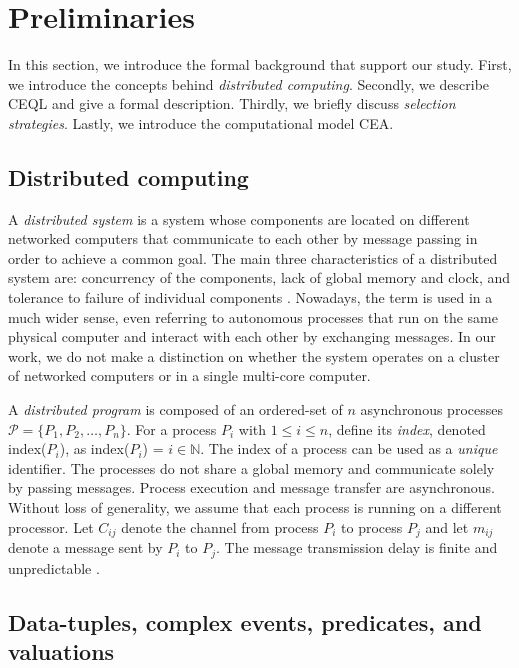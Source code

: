 \chapter{Preliminaries}\label{chapter:preliminaries}

In this section, we introduce the formal background that support our study.
First, we introduce the concepts behind \emph{distributed computing}.
Secondly, we describe CEQL and give a formal description.
Thirdly, we briefly discuss \emph{selection strategies}.
Lastly, we introduce the computational model CEA.

\section{Distributed computing}\label{sec:distributed_computing}

A \emph{distributed system} is a system whose components are located on different networked computers that communicate to each other by message passing in order to achieve a common goal. The main three characteristics of a distributed system are: concurrency of the components, lack of global memory and clock, and tolerance to failure of individual components \cite{distributed-computing-book}. Nowadays, the term is used in a much wider sense, even referring to autonomous processes that run on the same physical computer and interact with each other by exchanging messages. In our work, we do not make a distinction on whether the system operates on a cluster of networked computers or in a single multi-core computer.

A \emph{distributed program} is composed of an ordered-set of $n$ asynchronous processes $\mathcal{P} = \{ P_{1}, P_{2}, \ldots, P_{n}\}$. For a process $P_{i}$ with $1 \le i \le n$, define its \emph{index}, denoted index($P_{i}$), as index($P_{i}$) = $i \in \mathbb{N}$. The index of a process can be used as a \emph{unique} identifier. The processes do not share a global memory and communicate solely by passing messages. Process execution and message transfer are asynchronous. Without loss of generality, we assume that each process is running on a different processor. Let $C_{ij}$ denote the channel from process $P_{i}$ to process $P_{j}$ and let $m_{ij}$ denote a message sent by $P_{i}$ to $P_{j}$. The message transmission delay is finite and unpredictable \cite{distributed-computing-book}.

\section{Data-tuples, complex events, predicates, and valuations}\label{sec:ceql}

